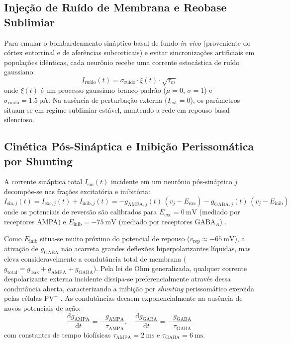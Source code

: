 \documentclass[12pt,openright,oneside,a4paper,brazil]{abntex2}
\begin{document}
\subsection{Injeção de Ruído de Membrana e Reobase Sublimiar}
Para emular o bombardeamento sináptico basal de fundo \emph{in vivo} (proveniente do córtex entorrinal e de aferências subcorticais) e evitar sincronizações artificiais em populações idênticas, cada neurônio recebe uma corrente estocástica de ruído gaussiano:
\begin{equation}
    I_{\text{ruído}}(t) = \sigma_{\text{ruído}} \cdot \xi(t) \cdot \sqrt{\tau_m}
\end{equation}
onde $\xi(t)$ é um processo gaussiano branco padrão ($\mu = 0$, $\sigma = 1$) e $\sigma_{\text{ruído}} = \qty{1.5}{\pico\ampere}$. Na ausência de perturbação externa ($I_{\text{ext}} = 0$), os parâmetros situam-se em regime sublimiar estável, mantendo a rede em repouso basal silencioso.

\subsection{Cinética Pós-Sináptica e Inibição Perissomática por Shunting}
A corrente sináptica total $I_{\text{sin}}(t)$ incidente em um neurônio pós-sináptico $j$ decompõe-se nas frações excitatória e inibitória:
\begin{equation}
    I_{\text{sin},j}(t) = I_{\text{exc},j}(t) + I_{\text{inib},j}(t) = -g_{\text{AMPA},j}(t)\,(v_j - E_{\text{exc}}) - g_{\text{GABA},j}(t)\,(v_j - E_{\text{inib}}) \label{eq:corrente_sinaptica}
\end{equation}
onde os potenciais de reversão são calibrados para $E_{\text{exc}} = \qty{0}{\milli\volt}$ (mediado por receptores AMPA) e $E_{\text{inib}} = \qty{-75}{\milli\volt}$ (mediado por receptores $\text{GABA}_A$) \cite{dayan2001, gerstner2014}. 

Como $E_{\text{inib}}$ situa-se muito próximo do potencial de repouso ($v_{\text{rep}} \approx \qty{-65}{\milli\volt}$), a ativação de $g_{\text{GABA}}$ não acarreta grandes deflexões hiperpolarizantes líquidas, mas eleva consideravelmente a condutância total de membrana ($g_{\text{total}} = g_{\text{leak}} + g_{\text{AMPA}} + g_{\text{GABA}}$). Pela lei de Ohm generalizada, qualquer corrente despolarizante externa incidente dissipa-se preferencialmente através dessa condutância aberta, caracterizando a inibição por \emph{shunting} perissomático exercida pelas células $\text{PV}^+$ \cite{buzsaki2006}. As condutâncias decaem exponencialmente na ausência de novos potenciais de ação:
\begin{equation}
    \frac{\mathrm{d}g_{\text{AMPA}}}{\mathrm{d}t} = -\frac{g_{\text{AMPA}}}{\tau_{\text{AMPA}}}, \quad \frac{\mathrm{d}g_{\text{GABA}}}{\mathrm{d}t} = -\frac{g_{\text{GABA}}}{\tau_{\text{GABA}}}
\end{equation}
com constantes de tempo biofísicas $\tau_{\text{AMPA}} = \qty{2}{\milli\second}$ e $\tau_{\text{GABA}} = \qty{6}{\milli\second}$.
\end{document}

